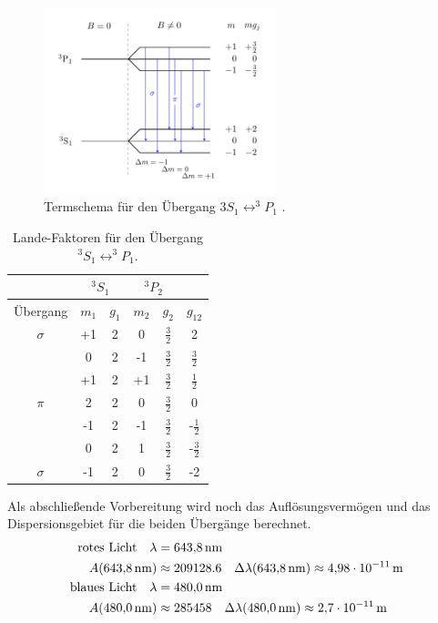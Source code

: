 \FloatBarrier
\begin{figure}[h]
  \centering
  \includegraphics[width=0.6\textwidth]{pics/termschema_blau.pdf}
  \caption{Termschema für den Übergang $3S_1\leftrightarrow ^3\!\!P_1$ \cite{luckyjosh}.}
  \label{fig: termschema_blau}
\end{figure}
\FloatBarrier

\FloatBarrier
\begin{table}

  \caption{Lande-Faktoren für den Übergang $^3S_1\leftrightarrow ^3\!\!P_1$.}
	\label{tab:Lande_blau}
	\centering
  \renewcommand{\arraystretch}{1.2}
  \begin{tabular}{cccccc}
		\toprule
    & \multicolumn{2}{c}{${}^3S_1$}  & \multicolumn{2}{c}{${}^3P_2$} \\
		\midrule
    Übergang & $m_1$  & $g_{1}$ & $m_2$ & $ g_2$ & $g_{12}$\\
		\midrule
		$\sigma$ & +1 & 2 & 0 & $\frac{3}{2}$& 2\\
		& 0 & 2 & -1 & $\frac{3}{2}$ & $\frac{3}{2}$\\
		\midrule
		& +1 & 2 & +1 & $\frac{3}{2}$ & $\frac{1}{2}$\\
		$\pi$ & 2 & 2 & 0 & $\frac{3}{2}$ & 0 \\
		& -1 & 2 & -1 & $\frac{3}{2}$ & -$\frac{1}{2}$\\
		\midrule
		& 0 & 2 & 1 & $\frac{3}{2}$ & -$\frac{3}{2}$\\
		$\sigma$ & -1 & 2 & 0 & $\frac{3}{2}$& -2\\
		\bottomrule
	\end{tabular}
\end{table}
\FloatBarrier

Als abschließende Vorbereitung wird noch das Auflösungsvermögen und das Dispersionsgebiet
für die beiden Übergänge berechnet.
\begin{align}
\text{rotes Licht}\quad  \lambda&=\SI{643.8}{\nano\meter} \notag\\
   A(\SI{643.8}{\nano\meter})&\approx 209128.6 \quad \Delta \lambda(\SI{643.8}{\nano\meter})\approx\SI{4.98e-11}{\meter} \label{eq: auf_dis_rot} \\
\text{blaues Licht}  \quad \lambda&=\SI{480.0}{\nano\meter}\notag \\
 A(\SI{480.0}{\nano\meter})&\approx 285458 \quad \Delta \lambda(\SI{480.0}{\nano\meter})\approx \SI{2.7e-11}{\meter} \label{eq: auf_dis_blau}
\end{align}


